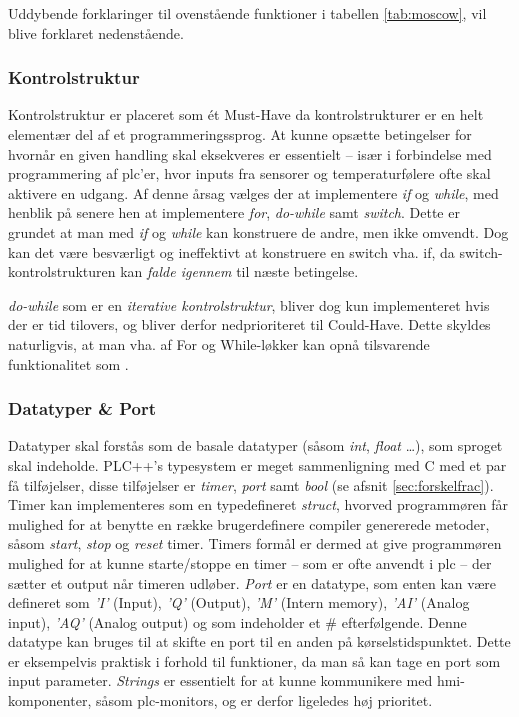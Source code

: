 \noindent Uddybende forklaringer til ovenstående funktioner i tabellen \ref{tab:moscow}, vil blive forklaret nedenstående. 

\subsubsection{Kontrolstruktur}
Kontrolstruktur er placeret som ét Must-Have da kontrolstrukturer er en helt elementær del af et programmeringssprog. At kunne opsætte betingelser for hvornår en given handling skal eksekveres er essentielt – især i forbindelse med programmering af \gls{plc}'er, hvor inputs fra sensorer og temperaturfølere ofte skal aktivere en udgang. 
Af denne årsag vælges der at implementere \textit{if} og \textit{while}, med henblik på senere hen at implementere \textit{for}, \textit{do-while} samt \textit{switch}. Dette er grundet at man med \textit{if} og \textit{while} kan konstruere de andre, men ikke omvendt. Dog kan det være besværligt og ineffektivt at konstruere en switch vha. if, da switch-kontrolstrukturen kan \textit{falde igennem} til næste betingelse.

\textit{do-while} som er en \textit{iterative kontrolstruktur}, bliver dog kun implementeret hvis der er tid tilovers, og bliver derfor nedprioriteret til Could-Have. Dette skyldes naturligvis, at man vha. af For og While-løkker kan opnå tilsvarende funktionalitet som .

\subsubsection{Datatyper \& Port}
Datatyper skal forstås som de basale datatyper (såsom \textit{int}, \textit{float} …), som sproget skal indeholde. PLC++'s typesystem er meget sammenligning med C med et par få tilføjelser, disse tilføjelser er \textit{timer}, \textit{port} samt \textit{bool} (se afsnit \ref{sec:forskelfrac}).
Timer kan implementeres som en typedefineret \textit{struct}, hvorved programmøren får mulighed for at benytte en række brugerdefinere compiler genererede metoder, såsom \textit{start}, \textit{stop} og \textit{reset} timer. Timers formål er dermed at give programmøren mulighed for at kunne starte/stoppe en timer – som er ofte anvendt i \gls{plc} – der sætter et output når timeren udløber.
\textit{Port} er en datatype, som enten kan være defineret som \textit{'I'} (Input), \textit{'Q'} (Output), \textit{'M'} (Intern memory), \textit{'AI'} (Analog input), \textit{'AQ'} (Analog output) og som indeholder et \# efterfølgende. Denne datatype kan bruges til at skifte en port til en anden på kørselstidspunktet. Dette er eksempelvis praktisk i forhold til funktioner, da man så kan tage en port som input parameter.
\textit{Strings} er essentielt for at kunne kommunikere med \gls{hmi}-komponenter, såsom \gls{plc}-monitors, og er derfor ligeledes høj prioritet. 

